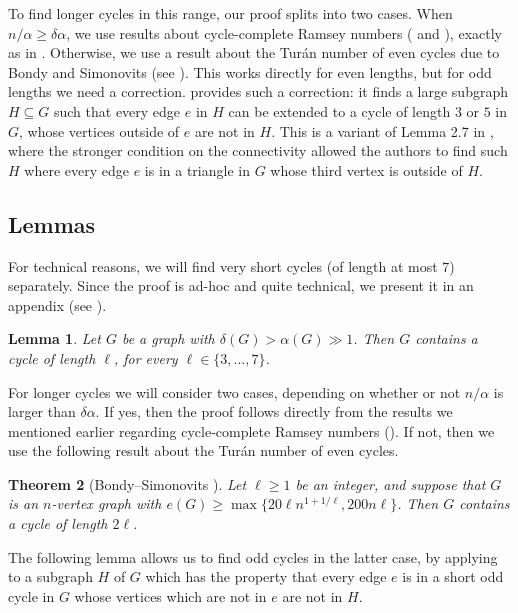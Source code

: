 \documentclass[11pt,english]{article}
\theoremstyle{plain}
\newtheorem{theorem}{Theorem}[section]
\newtheorem{lemma}[theorem]{Lemma}
\theoremstyle{definition}
\theoremstyle{remark}
\begin{document}
	To find longer cycles in this range, our proof splits into two cases. When $n/\alpha \ge \delta \alpha$, we use results about cycle-complete Ramsey numbers ( and ), exactly as in \cite{draganic2023chvatal}. Otherwise, we use a result about the Tur\'an number of even cycles due to Bondy and Simonovits \cite{bondy1974cycles} (see ). 
	This works directly for even lengths, but for odd lengths we need a correction. 
	 provides such a correction: it finds a large subgraph $H \subseteq G$ such that every edge $e$ in $H$ can be extended to a cycle of length $3$ or $5$ in $G$, whose vertices outside of $e$ are not in $H$. This is a variant of Lemma 2.7 in \cite{draganic2023chvatal}, where the stronger condition on the connectivity allowed the authors to find such $H$ where every edge $e$ is in a triangle in $G$ whose third vertex is outside of $H$.

	\subsection{Lemmas}

		For technical reasons, we will find very short cycles (of length at most $7$) separately. Since the proof is ad-hoc and quite technical, we present it in an appendix (see ).

		\begin{lemma} \label{lem:short-cycles}
			Let $G$ be a graph with $\delta(G) > \alpha(G) \gg 1$.
			Then $G$ contains a cycle of length $\ell$, for every $\ell \in \{3,\ldots,7\}$.
		\end{lemma}

		For longer cycles we will consider two cases, depending on whether or not $n/\alpha$ is larger than $\delta \alpha$. If yes, then the proof follows directly from the results we mentioned earlier regarding cycle-complete Ramsey numbers (). If not, then we use the following result about the Tur\'an number of even cycles.

		\begin{theorem}[Bondy--Simonovits \cite{bondy1974cycles}] \label{thm:even-cycle}
			Let $\ell \ge 1$ be an integer, 
			and suppose that $G$ is an $n$-vertex graph with $e(G) \ge \max\{20\ell n^{1+1/\ell}, 200n \ell\}$. Then $G$ contains a cycle of length $2\ell$.
		\end{theorem}

		The following lemma allows us to find odd cycles in the latter case, by applying  to a subgraph $H$ of $G$ which has the property that every edge $e$ is in a short odd cycle in $G$ whose vertices which are not in $e$ are not in $H$.
\end{document}
